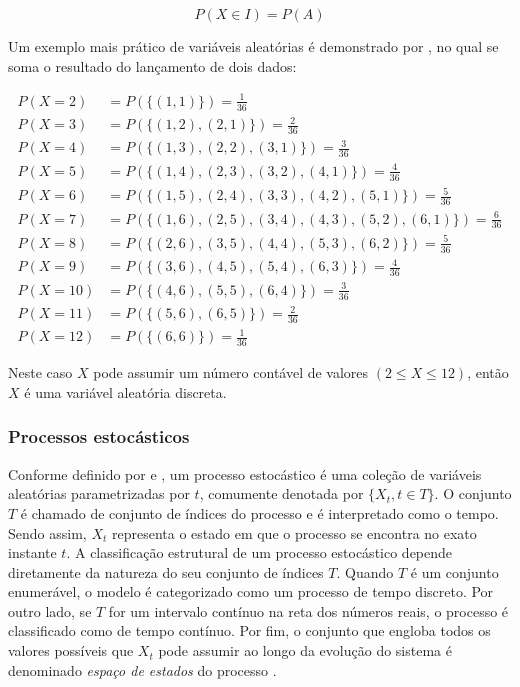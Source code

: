 \documentclass[
    12pt,                %
    openright,           %
    oneside,             %
    a4paper,             %
    english,             %
    brazil               %
]{abntex2}
\begin{document}
\begin{equation}
    P(X \in I) = P(A)
\end{equation} \cite{FISZ}

Um exemplo mais prático de variáveis aleatórias é demonstrado por , no qual se soma o resultado do lançamento de dois dados:

\begin{align*}
    P(X = 2)  &= P(\{(1,1)\}) = \frac{1}{36} \\
    P(X = 3)  &= P(\{(1,2), (2,1)\}) = \frac{2}{36} \\
    P(X = 4)  &= P(\{(1,3), (2,2), (3,1)\}) = \frac{3}{36} \\
    P(X = 5)  &= P(\{(1,4), (2,3), (3,2), (4,1)\}) = \frac{4}{36} \\
    P(X = 6)  &= P(\{(1,5), (2,4), (3,3), (4,2), (5,1)\}) = \frac{5}{36} \\
    P(X = 7)  &= P(\{(1,6), (2,5), (3,4), (4,3), (5,2), (6,1)\}) = \frac{6}{36} \\
    P(X = 8)  &= P(\{(2,6), (3,5), (4,4), (5,3), (6,2)\}) = \frac{5}{36} \\
    P(X = 9)  &= P(\{(3,6), (4,5), (5,4), (6,3)\}) = \frac{4}{36} \\
    P(X = 10) &= P(\{(4,6), (5,5), (6,4)\}) = \frac{3}{36} \\
    P(X = 11) &= P(\{(5,6), (6,5)\}) = \frac{2}{36} \\
    P(X = 12) &= P(\{(6,6)\}) = \frac{1}{36}
\end{align*}

Neste caso $X$ pode assumir um número contável de valores $(2 \leq X \leq 12)$, então $X$ é uma variável aleatória discreta.

\subsubsection{Processos estocásticos}
Conforme definido por  e , um processo estocástico é uma coleção de variáveis aleatórias parametrizadas por $t$, comumente denotada 
por $\{X_t, t \in T\}$. O conjunto $T$ é chamado de conjunto de índices do processo e é interpretado como o tempo. Sendo assim, $X_t$ representa o estado em que o 
processo se encontra no exato instante $t$. A classificação estrutural de um processo estocástico depende diretamente da natureza do seu conjunto de índices $T$. Quando 
$T$ é um conjunto enumerável, o modelo é categorizado como um processo de tempo discreto. Por outro lado, se $T$ for um intervalo contínuo na reta dos números reais, o 
processo é classificado como de tempo contínuo. Por fim, o conjunto que engloba todos os valores possíveis que $X_t$ pode assumir ao longo da evolução do sistema é 
denominado \textit{espaço de estados} do processo \cite{ROSS}.
\end{document}
